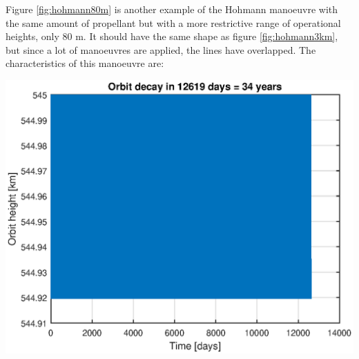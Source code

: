 Figure \ref{fig:hohmann80m} is another example of the Hohmann manoeuvre with the same amount of propellant but with a more restrictive range of operational heights, only 80 m. It should have the same shape as figure \ref{fig:hohmann3km}, but since a lot of manoeuvres are applied, the lines have overlapped. The characteristics of this manoeuvre are:

\begin{minipage}{\textwidth}
\begin{minipage}[b]{0.49\textwidth}
\centering
\includegraphics[scale=0.4]{ThrustersDrag/thrust80m.eps}
\label{fig:hohmann80m}
\end{minipage}
\hfill
{}
\end{minipage}

